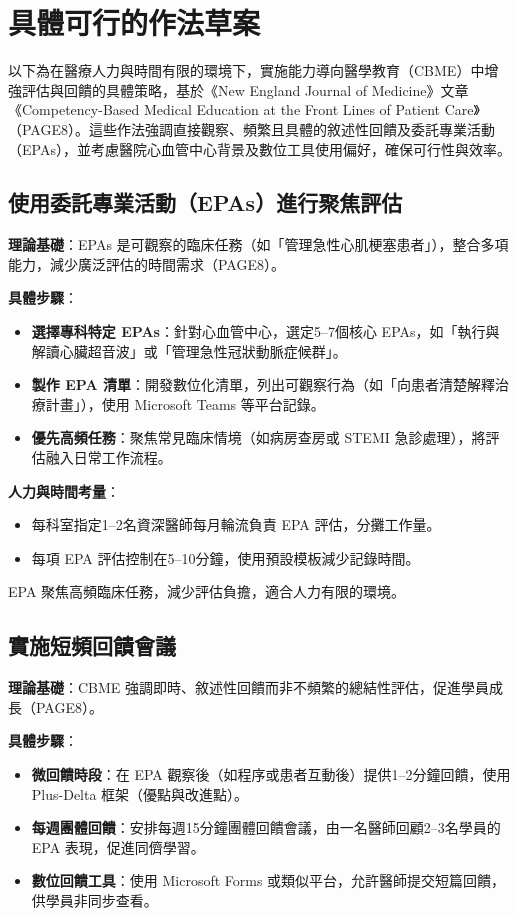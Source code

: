 \documentclass[12pt,a4paper]{article}
\newcommand{\note}[1]{
    \par
    \noindent
    \begin{tcolorbox}[
        colback=emergency_blue!5!white,
        colframe=emergency_blue,
        title=\textbf{重點提醒},
        fonttitle=\bfseries,
        boxrule=0.5pt,
        arc=3pt,
        left=6pt,
        right=6pt,
        top=6pt,
        bottom=6pt
    ]
    #1
    \end{tcolorbox}
}
\begin{document}
\section{具體可行的作法草案}

以下為在醫療人力與時間有限的環境下，實施能力導向醫學教育（CBME）中增強評估與回饋的具體策略，基於《New England Journal of Medicine》文章《Competency-Based Medical Education at the Front Lines of Patient Care》（PAGE8）。這些作法強調直接觀察、頻繁且具體的敘述性回饋及委託專業活動（EPAs），並考慮醫院心血管中心背景及數位工具使用偏好，確保可行性與效率。

\subsection{使用委託專業活動（EPAs）進行聚焦評估}
\textbf{理論基礎}：EPAs 是可觀察的臨床任務（如「管理急性心肌梗塞患者」），整合多項能力，減少廣泛評估的時間需求（PAGE8）。

\textbf{具體步驟}：
\begin{itemize}[nosep]
    \item \textbf{選擇專科特定 EPAs}：針對心血管中心，選定5–7個核心 EPAs，如「執行與解讀心臟超音波」或「管理急性冠狀動脈症候群」。
    \item \textbf{製作 EPA 清單}：開發數位化清單，列出可觀察行為（如「向患者清楚解釋治療計畫」），使用 Microsoft Teams 等平台記錄。
    \item \textbf{優先高頻任務}：聚焦常見臨床情境（如病房查房或 STEMI 急診處理），將評估融入日常工作流程。
\end{itemize}

\textbf{人力與時間考量}：
\begin{itemize}[nosep]
    \item 每科室指定1–2名資深醫師每月輪流負責 EPA 評估，分攤工作量。
    \item 每項 EPA 評估控制在5–10分鐘，使用預設模板減少記錄時間。
\end{itemize}

\vspace{0.5cm}
\note{
EPA 聚焦高頻臨床任務，減少評估負擔，適合人力有限的環境。
}

\subsection{實施短頻回饋會議}
\textbf{理論基礎}：CBME 強調即時、敘述性回饋而非不頻繁的總結性評估，促進學員成長（PAGE8）。

\textbf{具體步驟}：
\begin{itemize}[nosep]
    \item \textbf{微回饋時段}：在 EPA 觀察後（如程序或患者互動後）提供1–2分鐘回饋，使用 Plus-Delta 框架（優點與改進點）。
    \item \textbf{每週團體回饋}：安排每週15分鐘團體回饋會議，由一名醫師回顧2–3名學員的 EPA 表現，促進同儕學習。
    \item \textbf{數位回饋工具}：使用 Microsoft Forms 或類似平台，允許醫師提交短篇回饋，供學員非同步查看。
\end{itemize}
\end{document}
